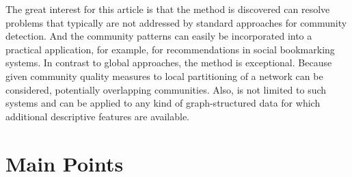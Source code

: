 \documentclass[a4paper]{article}
\begin{document}
The great interest for this article is that the method is discovered can resolve problems that typically are not addressed by standard approaches for community detection. And the community patterns can easily be incorporated into a practical application, for example, for recommendations in social bookmarking systems.
In contrast to global approaches, the method is exceptional. Because given community quality measures to local partitioning of a network can be considered, potentially overlapping communities. Also, is not limited to such systems and can be applied to any kind of graph-structured data for which additional descriptive features are available.

\section{Main Points}
\end{document}
